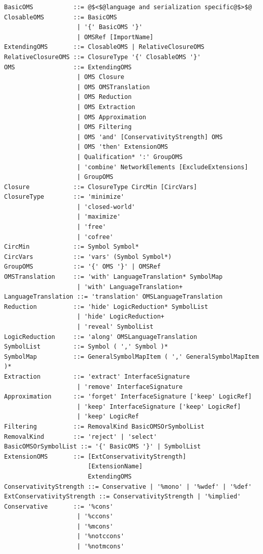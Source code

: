 \documentclass[10pt, a4paper]{isov2}
\begin{document}
\begin{lstlisting}[language=ebnf,escapeinside={@@},mathescape]
BasicOMS           ::= @$<$@language and serialization specific@$>$@
ClosableOMS        ::= BasicOMS 
                    | '{' BasicOMS '}' 
                    | OMSRef [ImportName]
ExtendingOMS       ::= ClosableOMS | RelativeClosureOMS
RelativeClosureOMS ::= ClosureType '{' ClosableOMS '}'
OMS                ::= ExtendingOMS
                    | OMS Closure
                    | OMS OMSTranslation
                    | OMS Reduction
                    | OMS Extraction
                    | OMS Approximation
                    | OMS Filtering
                    | OMS 'and' [ConservativityStrength] OMS
                    | OMS 'then' ExtensionOMS
                    | Qualification* ':' GroupOMS
                    | 'combine' NetworkElements [ExcludeExtensions]
                    | GroupOMS
Closure            ::= ClosureType CircMin [CircVars]
ClosureType        ::= 'minimize'
                    | 'closed-world'
                    | 'maximize'
                    | 'free'
                    | 'cofree'
CircMin            ::= Symbol Symbol*
CircVars           ::= 'vars' (Symbol Symbol*)
GroupOMS           ::= '{' OMS '}' | OMSRef
OMSTranslation     ::= 'with' LanguageTranslation* SymbolMap
                    | 'with' LanguageTranslation+
LanguageTranslation ::= 'translation' OMSLanguageTranslation
Reduction          ::= 'hide' LogicReduction* SymbolList
                    | 'hide' LogicReduction+
                    | 'reveal' SymbolList
LogicReduction     ::= 'along' OMSLanguageTranslation
SymbolList         ::= Symbol ( ',' Symbol )*
SymbolMap          ::= GeneralSymbolMapItem ( ',' GeneralSymbolMapItem )*
Extraction         ::= 'extract' InterfaceSignature
                    | 'remove' InterfaceSignature
Approximation      ::= 'forget' InterfaceSignature ['keep' LogicRef]
                    | 'keep' InterfaceSignature ['keep' LogicRef]
                    | 'keep' LogicRef
Filtering          ::= RemovalKind BasicOMSOrSymbolList
RemovalKind        ::= 'reject' | 'select'
BasicOMSOrSymbolList ::= '{' BasicOMS '}' | SymbolList
ExtensionOMS       ::= [ExtConservativityStrength]
                       [ExtensionName]
                       ExtendingOMS
ConservativityStrength ::= Conservative | '%mono' | '%wdef' | '%def'
ExtConservativityStrength ::= ConservativityStrength | '%implied'
Conservative       ::= '%cons'
                    | '%ccons'
                    | '%mcons'
                    | '%notccons'
                    | '%notmcons'

\end{lstlisting}
\end{document}
